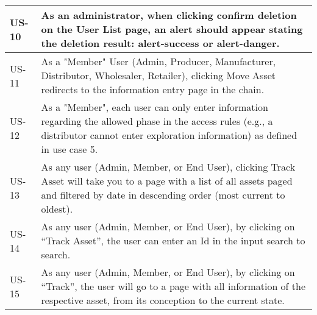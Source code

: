 \begin{table}[H]
\begin{tabular}{|l|p{13.5cm}|}
    \hline
    US-10 & As an administrator, when clicking confirm deletion on the User List page, an alert should appear stating the deletion result: alert-success or alert-danger.\\
    \hline
    US-11 & As a "Member" User (Admin, Producer, Manufacturer, Distributor, Wholesaler, Retailer), clicking Move Asset redirects to the information entry page in the chain.\\
    \hline
    US-12 & As a "Member", each user can only enter information regarding the allowed phase in the access rules (e.g., a distributor cannot enter exploration information) as defined in use case 5.\\
    \hline
    US-13 & As any user (Admin, Member, or End User), clicking Track Asset will take you to a page with a list of all assets paged and filtered by date in descending order (most current to oldest).\\
    \hline
    US-14 & As any user (Admin, Member, or End User), by clicking on “Track Asset”, the user can enter an Id in the input search to search.\\
    \hline
    US-15 & As any user (Admin, Member, or End User), by clicking on “Track”, the user will go to a page with all information of the respective asset, from its conception to the current state.\\
    \hline
    \end{tabular}
\end{table}